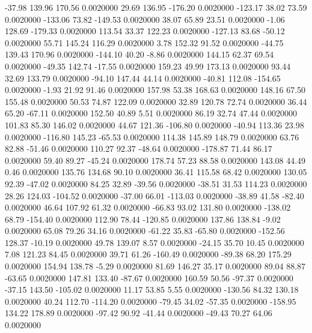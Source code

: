   -37.98  139.96  170.56   0.0020000
   29.69  136.95 -176.20   0.0020000
 -123.17   38.02   73.59   0.0020000
 -133.06   73.82 -149.53   0.0020000
   38.07   65.89   23.51   0.0020000
   -1.06  128.69 -179.33   0.0020000
  113.54   33.37  122.23   0.0020000
 -127.13   83.68  -50.12   0.0020000
   55.71  145.24  116.29   0.0020000
    3.78  152.32   91.52   0.0020000
  -44.75  139.43  170.96   0.0020000
 -144.10   40.20   -8.86   0.0020000
  144.15   62.37   69.54   0.0020000
  -49.35  142.74  -17.55   0.0020000
  159.23   49.99  173.13   0.0020000
   93.44   32.69  133.79   0.0020000
  -94.10  147.44   44.14   0.0020000
  -40.81  112.08 -154.65   0.0020000
   -1.93   21.92   91.46   0.0020000
  157.98   53.38  168.63   0.0020000
  148.16   67.50  155.48   0.0020000
   50.53   74.87  122.09   0.0020000
   32.89  120.78   72.74   0.0020000
   36.44   65.20  -67.11   0.0020000
  152.50   40.89    5.51   0.0020000
   86.19   32.74   47.44   0.0020000
  101.83   85.30  146.02   0.0020000
   44.67  121.36 -106.80   0.0020000
  -40.94  113.36   23.98   0.0020000
 -116.80  145.23  -65.53   0.0020000
  114.38  145.89  148.79   0.0020000
   63.76   82.88  -51.46   0.0020000
  110.27   92.37  -48.64   0.0020000
 -178.87   71.44   86.17   0.0020000
   59.40   89.27  -45.24   0.0020000
  178.74   57.23   88.58   0.0020000
  143.08   44.49    0.46   0.0020000
  135.76  134.68   90.10   0.0020000
   36.41  115.58   68.42   0.0020000
  130.05   92.39  -47.02   0.0020000
   84.25   32.89  -39.56   0.0020000
  -38.51   31.53  114.23   0.0020000
   28.26  124.03 -104.52   0.0020000
  -37.00   66.01 -113.03   0.0020000
  -38.89   41.58  -82.40   0.0020000
   46.64  107.92   61.32   0.0020000
  -66.83   93.02  131.80   0.0020000
 -138.02   68.79 -154.40   0.0020000
  112.90   78.44 -120.85   0.0020000
  137.86  138.84   -9.02   0.0020000
   65.08   79.26   34.16   0.0020000
  -61.22   35.83  -65.80   0.0020000
 -152.56  128.37  -10.19   0.0020000
   49.78  139.07    8.57   0.0020000
  -24.15   35.70   10.45   0.0020000
    7.08  121.23   84.45   0.0020000
   39.71   61.26 -160.49   0.0020000
  -89.38   68.20  175.29   0.0020000
  154.94  138.78   -5.29   0.0020000
   81.69  146.27   35.17   0.0020000
   89.04   88.87  -63.65   0.0020000
  147.81  133.40  -87.67   0.0020000
  160.59   50.56  -97.37   0.0020000
  -37.15  143.50 -105.02   0.0020000
   11.17   53.85    5.55   0.0020000
 -130.56   84.32  130.18   0.0020000
   40.24  112.70 -114.20   0.0020000
  -79.45   34.02  -57.35   0.0020000
 -158.95  134.22  178.89   0.0020000
  -97.42   90.92  -41.44   0.0020000
  -49.43   70.27   64.06   0.0020000
